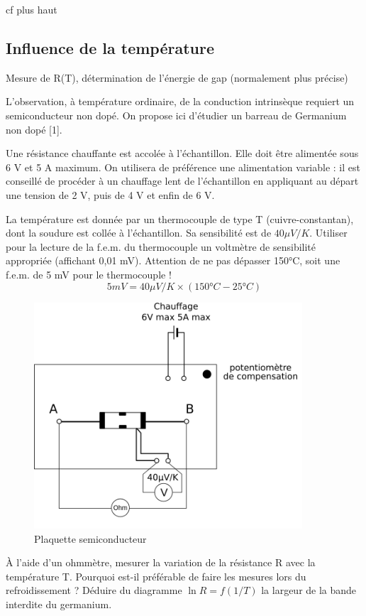 \documentclass{article}%
\begin{document}
cf plus haut
\subsection{Influence de la température}
Mesure de R(T), détermination de l'énergie de gap (normalement plus précise)

L'observation, à température ordinaire, de la conduction intrinsèque requiert un semiconducteur non dopé. On propose ici d'étudier un barreau de Germanium non dopé [1].

Une résistance chauffante est accolée à l'échantillon. Elle doit être alimentée sous 6 V et 5 A maximum. On utilisera de préférence une alimentation variable : il est conseillé de procéder à un chauffage lent de l'échantillon en appliquant au départ une tension de 2 V, puis de 4 V et enfin de 6 V.

La température est donnée par un thermocouple de type T (cuivre-constantan), dont la soudure est collée à l'échantillon. Sa sensibilité est de $40 \mu V/K$. Utiliser pour la lecture de la f.e.m. du thermocouple un voltmètre de sensibilité appropriée (affichant 0,01 mV). Attention de ne pas dépasser 150°C, soit une f.e.m. de 5 mV pour le thermocouple ! \[5 mV=40 \mu V/K \times (150°C-25°C)\]

\begin{figure}
	\centerline{\includegraphics[width=10cm]{images-exp/Semicon3b.png}}
	\caption{Plaquette semiconducteur}
\end{figure}

À l'aide d'un ohmmètre, mesurer la variation de la résistance R avec la température T. Pourquoi est-il préférable de faire les mesures lors du refroidissement ? Déduire du diagramme $\ln R = f(1/T)$ la largeur de la bande interdite du germanium.
\end{document}
